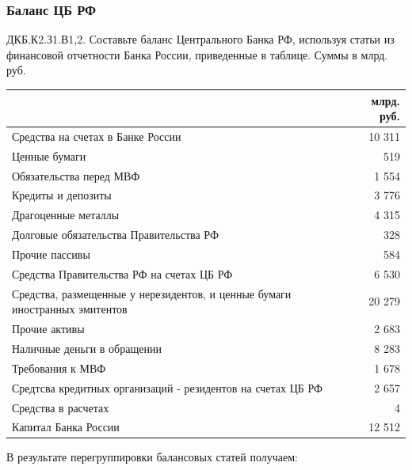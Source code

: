 \documentclass[12pt, table, a4paper,twoside]{exam}
\begin{document}
\begin{questions}
\subsubsection{Баланс ЦБ РФ}
\question[10] ДКБ.К2.З1.В1,2. Составьте баланс Центрального Банка РФ, используя статьи из финансовой отчетности Банка России, приведенные в таблице. Суммы в млрд. руб.
\begin{table}[h]
	\begin{tabularx}{\linewidth}[b]{@{}>{\raggedright\arraybackslash}Xr@{}}		& млрд. руб.\\
		\toprule
		Средства на счетах в Банке России &             10 311    \\
		Ценные бумаги &                  519    \\
		Обязательства перед МВФ &               1 554    \\
		Кредиты и депозиты &               3 776    \\
		Драгоценные металлы &               4 315    \\
		Долговые обязательства Правительства РФ &                  328    \\
		Прочие пассивы &                  584    \\
		Средства Правительства РФ на счетах ЦБ РФ &               6 530    \\
		Средства, размещенные у нерезидентов, и ценные бумаги иностранных эмитентов &             20 279    \\
		Прочие активы &               2 683    \\
		Наличные деньги в обращении &               8 283    \\
		Требования к МВФ &               1 678    \\
		Средтсва кредитных организаций - резидентов на счетах ЦБ РФ &               2 657    \\
		Средства в расчетах &                      4    \\
		Капитал Банка России &             12 512    \\
		\bottomrule
	\end{tabularx}%
	\label{tab:addlabel}%
\end{table}%

\vfill\null\pagebreak
\begin{solution}[12em] В результате перегруппировки балансовых статей получаем:
	

\end{solution}
\end{questions}
\end{document}
